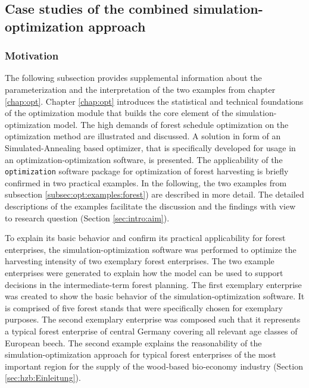 \subsection{Case studies of the combined simulation-optimization approach}
\label{subsec:discussion:struct:opt:application}
\subsubsection{Motivation}
\label{subsubsec:discussion:struct:opt:application:introduction}
The following subsection provides supplemental information about the parameterization and the interpretation of the two examples from chapter \ref{chap:opt}. Chapter \ref{chap:opt} introduces the statistical and technical foundations of the optimization module that builds the core element of the simulation-optimization model. The high demands of forest schedule optimization on the optimization method are illustrated and discussed. A solution in form of an Simulated-Annealing based optimizer, that is specifically developed for usage in an optimization-optimization software, is presented. The applicability of the \texttt{optimization} software package for optimization of forest harvesting is briefly confirmed in two practical examples. In the following, the two examples from subsection \ref{subsec:opt:examples:forest}) are described in more detail. The detailed descriptions of the examples facilitate the discussion and the findings with view to research question (Section \ref{sec:intro:aim}).

To explain its basic behavior and confirm its practical applicability for forest enterprises, the si\-mu\-la\-tion-op\-ti\-mi\-za\-tion software was performed to optimize the harvesting intensity of two exemplary forest enterprises. The two example enterprises were generated to explain how the model can be used to support decisions in the intermediate-term forest planning. The first exemplary enterprise was created to show the basic behavior of the simulation-optimization software. It is comprised of five forest stands that were specifically chosen for exemplary purposes. The second exemplary enterprise was composed such that it represents a typical forest enterprise of central Germany covering all relevant age classes of European beech. The second example explains the reasonability of the simulation-optimization approach for typical forest enterprises of the most important region for the supply of the wood-based bio-economy industry (Section \ref{sec:hzb:Einleitung}).

